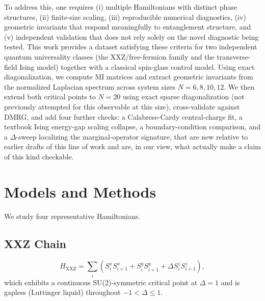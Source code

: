 \documentclass[aps,prx,reprint,amsmath,amssymb,superscriptaddress]{revtex4-2}
\begin{document}
To address this, one requires (i) multiple Hamiltonians with distinct phase structures, (ii)
finite-size scaling, (iii) reproducible numerical diagnostics, (iv) geometric invariants that
respond meaningfully to entanglement structure, and (v) independent validation that does not rely
solely on the novel diagnostic being tested. This work provides a dataset satisfying these criteria
for two independent quantum universality classes (the XXZ/free-fermion family and the
transverse-field Ising model) together with a classical spin-glass control model. Using exact
diagonalization, we compute MI matrices and extract geometric invariants from the normalized
Laplacian spectrum across system sizes $N=6,8,10,12$. We then extend both critical points to $N=20$
using exact sparse diagonalization (not previously attempted for this observable at this size),
cross-validate against DMRG, and add four further checks: a Calabrese-Cardy central-charge fit, a
textbook Ising energy-gap scaling collapse, a boundary-condition comparison, and a $\Delta$-sweep
localizing the marginal-operator signature, that are new relative to earlier drafts of this line
of work and are, in our view, what actually make a claim of this kind checkable.

\section{Models and Methods}

We study four representative Hamiltonians.

\subsection{XXZ Chain}
\begin{equation}
H_{\mathrm{XXZ}} = \sum_{i}
\left(
S_i^x S_{i+1}^x + S_i^y S_{i+1}^y + \Delta S_i^z S_{i+1}^z
\right),
\end{equation}
which exhibits a continuous SU(2)-symmetric critical point at $\Delta=1$ and is gapless (Luttinger
liquid) throughout $-1<\Delta\le 1$.
\end{document}
